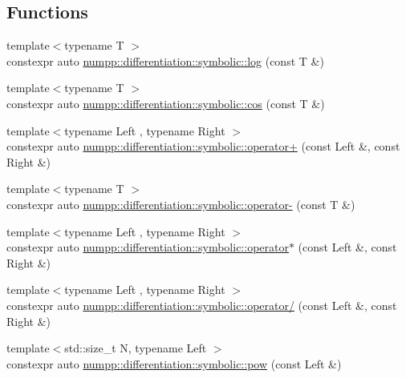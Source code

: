 \subsection*{Functions}
\begin{DoxyCompactItemize}
\item 
{\footnotesize template$<$typename T $>$ }\\constexpr auto \hyperlink{group__numpp__differentiation__symbolic_ga186ca63e28a816d1cb9c8175c7839468}{numpp\+::differentiation\+::symbolic\+::log} (const T \&)
\item 
{\footnotesize template$<$typename T $>$ }\\constexpr auto \hyperlink{group__numpp__differentiation__symbolic_gad414fd158986bf7fff7e258a6ebf182c}{numpp\+::differentiation\+::symbolic\+::cos} (const T \&)
\end{DoxyCompactItemize}
\begin{DoxyCompactItemize}
\item 
{\footnotesize template$<$typename Left , typename Right $>$ }\\constexpr auto \hyperlink{group__numpp__differentiation__symbolic_ga45bd7508b366431d72157d0f1ef6fac2}{numpp\+::differentiation\+::symbolic\+::operator+} (const Left \&, const Right \&)
\item 
{\footnotesize template$<$typename T $>$ }\\constexpr auto \hyperlink{group__numpp__differentiation__symbolic_ga4aecf7125ae67f3c834ed8ab5e14248a}{numpp\+::differentiation\+::symbolic\+::operator-\/} (const T \&)
\item 
{\footnotesize template$<$typename Left , typename Right $>$ }\\constexpr auto \hyperlink{group__numpp__differentiation__symbolic_ga0f6f3d22e3e712ce154f7f6c91e0cf46}{numpp\+::differentiation\+::symbolic\+::operator$\ast$} (const Left \&, const Right \&)
\item 
{\footnotesize template$<$typename Left , typename Right $>$ }\\constexpr auto \hyperlink{group__numpp__differentiation__symbolic_gac882bc2dcbffae1107c46bc3eac93a44}{numpp\+::differentiation\+::symbolic\+::operator/} (const Left \&, const Right \&)
\item 
{\footnotesize template$<$std\+::size\+\_\+t N, typename Left $>$ }\\constexpr auto \hyperlink{group__numpp__differentiation__symbolic_gaa52e3714ea3492f60c68cdb4974fe495}{numpp\+::differentiation\+::symbolic\+::pow} (const Left \&)
\end{DoxyCompactItemize}
